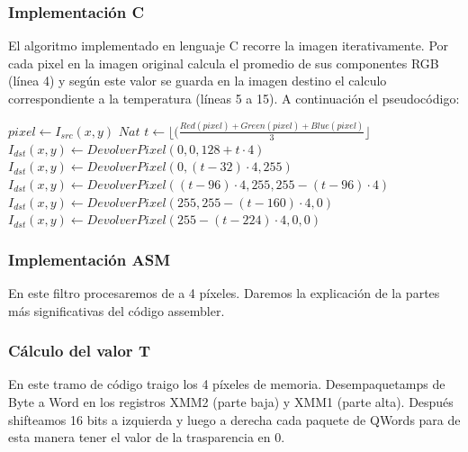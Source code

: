 \hfill
\subsubsection{Implementación C}

El algoritmo implementado en lenguaje C recorre la imagen iterativamente. Por cada pixel en la imagen original calcula el promedio de sus componentes RGB (línea 4) y según este valor se guarda en la imagen destino el calculo correspondiente a la temperatura (líneas 5 a 15). A continuación el pseudocódigo:
	
\begin{algorithm}[H]
  \begin{algorithmic}[1]
				\STATE $ pixel \gets I_{src}(x,y)$
				\STATE $Nat $ $ t \gets \lfloor(\frac{Red(pixel)+Green(pixel)+Blue(pixel)}{3}\rfloor$
					\STATE $I_{dst}(x,y) \gets DevolverPixel(0,0,128+t \cdot 4)$
					\STATE $I_{dst}(x,y) \gets DevolverPixel(0,(t-32) \cdot 4,255)$
					\STATE $I_{dst}(x,y) \gets DevolverPixel((t-96) \cdot 4,255, 255-(t-96) \cdot 4)$
					\STATE $I_{dst}(x,y) \gets DevolverPixel(255, 255-(t-160) \cdot 4, 0)$
				\ELSE		
					\STATE $I_{dst}(x,y) \gets DevolverPixel(255-(t-224) \cdot 4, 0, 0)$
				\ENDIF	
			\ENDFOR
		 \ENDFOR
  \end{algorithmic}
  \caption{$temperature (I_{src}, I_{dst})$}
  \label{alg:temperature}
\end{algorithm}	

\subsubsection{Implementación ASM}
En este filtro procesaremos de a 4 píxeles. Daremos la explicación de la partes más significativas del código assembler.

\subsubsection*{Cálculo del valor T}

En este tramo de código traigo los 4 píxeles de memoria. Desempaquetamps de Byte a Word en los registros XMM2 (parte baja) y XMM1 (parte alta). Después shifteamos 16 bits a izquierda y luego a derecha cada paquete de QWords para de esta manera tener el valor de la trasparencia en 0.

